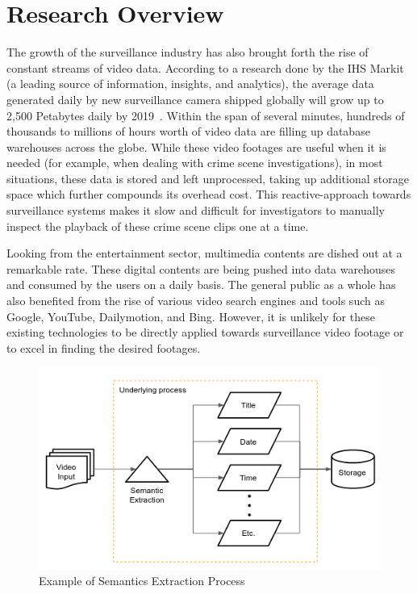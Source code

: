 \section{Research Overview}
\label{section:introduction}

The growth of the surveillance industry has also brought forth the rise of constant streams of video data. According to a research done by the IHS Markit (a leading source of information, insights, and analytics), the average data generated daily by new surveillance camera shipped globally will grow up to 2,500 Petabytes daily by 2019~\cite{woodhouse2016big}.
Within the span of several minutes, hundreds of thousands %
to millions of hours worth of video data are filling up database warehouses across the globe.
While these video footages are useful when it is needed (for example, when dealing with crime scene investigations), in most situations, these data is stored and left unprocessed, taking up additional storage space which further compounds its overhead cost.
This reactive-approach towards surveillance systems makes it slow and difficult for investigators to manually inspect the playback of these crime scene clips one at a time.

Looking from the entertainment sector, multimedia contents are dished out at a remarkable rate. These digital contents are being pushed into data warehouses and consumed by the users on a daily basis. The general public as a whole has also benefited from the rise of various video search engines and tools such as Google, YouTube, Dailymotion, and Bing. However, it is unlikely for these existing technologies to be directly applied towards surveillance video footage or to excel in finding the desired footages.

\begin{figure}[!hbt]\centering
\includegraphics[width=\textwidth]{image/general/simpleframe3.png}
\caption{Example of Semantics Extraction Process}
\label{fig:exampleframework2}
\end{figure}

